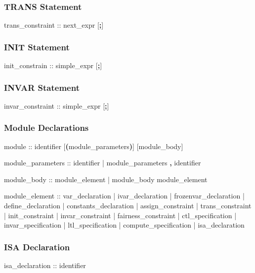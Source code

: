 \subsubsection{TRANS Statement}
\begin{Grammar}
trans_constraint ::  next_expr [\textbf{;}]
\end{Grammar}


\subsubsection{INIT Statement}
\begin{Grammar}
init_constrain ::  simple_expr [\textbf{;}]
\end{Grammar}


\subsubsection{INVAR Statement}
\begin{Grammar}
invar_constraint ::  simple_expr [\textbf{;}]
\end{Grammar}


\subsubsection{Module Declarations}
\begin{Grammar}
module ::  identifier [\textbf{(}module_parameters\textbf{)}] [module_body]

module_parameters ::
          identifier
        | module_parameters \textbf{,} identifier

module_body :: 
          module_element 
        | module_body module_element
           
module_element ::
          var_declaration
        | ivar_declaration
        | frozenvar_declaration
        | define_declaration
        | constants_declaration
        | assign_constraint
        | trans_constraint
        | init_constraint
        | invar_constraint
        | fairness_constraint
        | ctl_specification
        | invar_specification
        | ltl_specification
        | compute_specification
        | isa_declaration
\end{Grammar}


\subsubsection{ISA Declaration}
\begin{Grammar}
isa_declaration ::  identifier
\end{Grammar}


